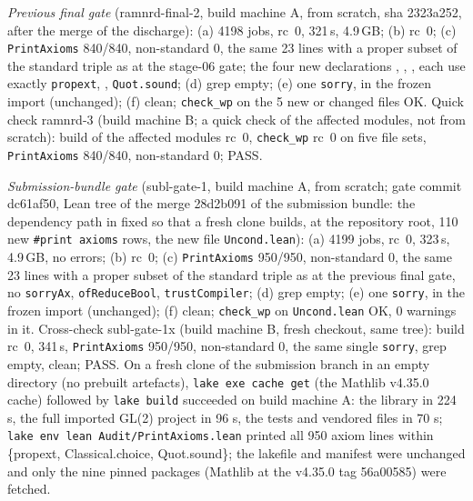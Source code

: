 \emph{Previous final gate} (ramnrd-final-2, build machine A, from scratch, sha 2323a252, after the merge of the 
discharge): (a) 4198 jobs, rc~0, 321\,s, 4.9\,GB; (b) rc~0; (c) \texttt{PrintAxioms} 840/840, non-standard 0,
the same 23 lines with a proper subset of the standard triple as at the stage-06 gate; the four new declarations
, , ,
 each use exactly \texttt{propext}, , \texttt{Quot.sound};
(d) grep empty; (e) one \texttt{sorry}, in the frozen import (unchanged); (f) clean; \texttt{check\_wp} on the 5 new or
changed files OK. Quick check ramnrd-3 (build machine B; a quick check of the affected modules, not from scratch): build of the affected modules rc~0, \texttt{check\_wp} rc~0 on five file
sets, \texttt{PrintAxioms} 840/840, non-standard 0; PASS.

\emph{Submission-bundle gate} (subl-gate-1, build machine A, from scratch; gate commit dc61af50, Lean tree of the merge 28d2b091 of the
submission bundle: the dependency path in  fixed so that a fresh clone builds, 
at the repository root, 110 new \texttt{\#print axioms} rows, the new file \texttt{Uncond.lean}): (a) 4199 jobs, rc~0, 323\,s,
4.9\,GB, no errors; (b) rc~0; (c) \texttt{PrintAxioms} 950/950, non-standard 0, the same 23 lines with a proper
subset of the standard triple as at the previous final gate, no \texttt{sorryAx}, \texttt{ofReduceBool}, \texttt{trustCompiler};
(d) grep empty; (e) one \texttt{sorry}, in the frozen import (unchanged); (f) clean; \texttt{check\_wp} on \texttt{Uncond.lean} OK,
0 warnings in it. Cross-check subl-gate-1x (build machine B, fresh checkout, same tree): build rc~0, 341\,s, \texttt{PrintAxioms}
950/950, non-standard 0, the same single \texttt{sorry}, grep empty,  clean; PASS.
On a fresh clone of the submission branch in an empty directory (no prebuilt artefacts), \texttt{lake exe cache get} (the Mathlib v4.35.0 cache) followed by \texttt{lake build} succeeded on build machine A: the library in 224 s, the full imported GL(2) project in 96 s, the tests and vendored files in 70 s; \texttt{lake env lean Audit/PrintAxioms.lean} printed all 950 axiom lines within \{propext, Classical.choice, Quot.sound\}; the lakefile and manifest were unchanged and only the nine pinned packages (Mathlib at the v4.35.0 tag 56a00585) were fetched.

